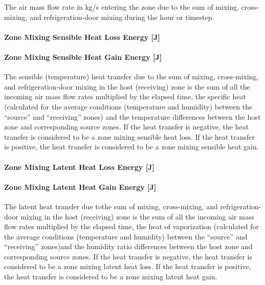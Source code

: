The air mass flow rate in kg/s entering the zone due to the sum of mixing, cross-mixing, and refrigeration-door mixing during the hour or timestep.

\paragraph{Zone Mixing Sensible Heat Loss Energy {[}J{]}}\label{zone-mixing-sensible-heat-loss-energy-j-2}

\paragraph{Zone Mixing Sensible Heat Gain Energy {[}J{]}}\label{zone-mixing-sensible-heat-gain-energy-j-2}

The sensible (temperature) heat transfer due to the sum of mixing, cross-mixing, and refrigeration-door mixing in the host (receiving) zone is the sum of all the incoming air mass flow rates multiplied by the elapsed time, the specific heat (calculated for the average conditions (temperature and humidity) between the ``source'' and ``receiving'' zones) and the temperature differences between the host zone and corresponding source zones. If the heat transfer is negative, the heat transfer is considered to be a zone mixing sensible heat loss. If the heat transfer is positive, the heat transfer is considered to be a zone mixing sensible heat gain.

\paragraph{Zone Mixing Latent Heat Loss Energy {[}J{]}}\label{zone-mixing-latent-heat-loss-energy-j-2}

\paragraph{Zone Mixing Latent Heat Gain Energy {[}J{]}}\label{zone-mixing-latent-heat-gain-energy-j-2}

The latent heat transfer due tothe sum of mixing, cross-mixing, and refrigeration-door mixing in the host (receiving) zone is the sum of all the incoming air mass flow rates multiplied by the elapsed time, the heat of vaporization (calculated for the average conditions (temperature and humidity) between the ``source'' and ``receiving'' zones)and the humidity ratio differences between the host zone and corresponding source zones. If the heat transfer is negative, the heat transfer is considered to be a zone mixing latent heat loss. If the heat transfer is positive, the heat transfer is considered to be a zone mixing latent heat gain.

